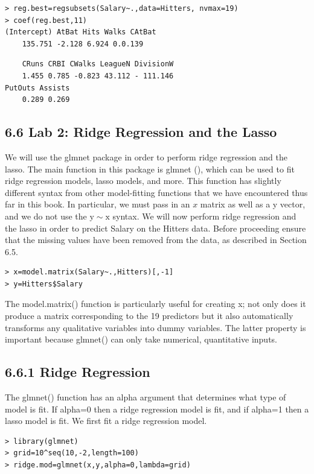 \documentclass[10pt]{article}
\begin{document}
\begin{verbatim}
> reg.best=regsubsets(Salary~.,data=Hitters, nvmax=19)
> coef(reg.best,11)
(Intercept) AtBat Hits Walks CAtBat
    135.751 -2.128 6.924 0.0.139
\end{verbatim}

\begin{verbatim}
    CRuns CRBI CWalks LeagueN DivisionW
    1.455 0.785 -0.823 43.112 - 111.146
PutOuts Assists
    0.289 0.269
\end{verbatim}

\subsection*{6.6 Lab 2: Ridge Regression and the Lasso}
We will use the glmnet package in order to perform ridge regression and the lasso. The main function in this package is glmnet (), which can be used to fit ridge regression models, lasso models, and more. This function has slightly different syntax from other model-fitting functions that we have encountered thus far in this book. In particular, we must pass in an $x$ matrix as well as a y vector, and we do not use the $\mathrm{y} \sim \mathrm{x}$ syntax. We will now perform ridge regression and the lasso in order to predict Salary on the Hitters data. Before proceeding ensure that the missing values have been removed from the data, as described in Section 6.5.

\begin{verbatim}
> x=model.matrix(Salary~.,Hitters)[,-1]
> y=Hitters$Salary
\end{verbatim}

The model.matrix() function is particularly useful for creating x; not only does it produce a matrix corresponding to the 19 predictors but it also automatically transforms any qualitative variables into dummy variables. The latter property is important because glmnet() can only take numerical, quantitative inputs.

\subsection*{6.6.1 Ridge Regression}
The glmnet() function has an alpha argument that determines what type of model is fit. If alpha=0 then a ridge regression model is fit, and if alpha=1 then a lasso model is fit. We first fit a ridge regression model.

\begin{verbatim}
> library(glmnet)
> grid=10^seq(10,-2,length=100)
> ridge.mod=glmnet(x,y,alpha=0,lambda=grid)
\end{verbatim}
\end{document}
